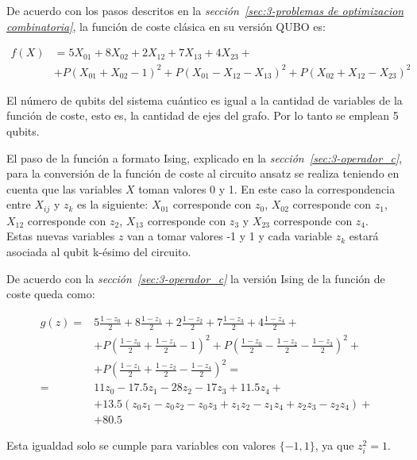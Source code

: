 De acuerdo con los pasos descritos en la \textit{sección~\ref{sec:3-problemas de optimizacion combinatoria}}, la función de coste clásica en su versión QUBO es:

\begin{align}
  f(X) &= 5X_{01} + 8X_{02} + 2X_{12} + 7X_{13} + 4X_{23} + \nonumber \\
       &+ P{(X_{01} + X_{02} - 1)}^2 + P{(X_{01} - X_{12} - X_{13})}^2 + P{(X_{02} + X_{12} - X_{23})}^2
\end{align}

El número de qubits del sistema cuántico es igual a la cantidad de variables de la función de coste, esto es, la cantidad de ejes del grafo.
Por lo tanto se emplean 5 qubits.

El paso de la función a formato Ising, explicado en la \textit{sección~\ref{sec:3-operador_c}}, para la conversión de la función de coste al circuito ansatz se realiza teniendo en cuenta que las variables $X$ toman valores 0 y 1.
En este caso la correspondencia entre $X_{ij}$ y $z_k$ es la siguiente:
$X_{01}$ corresponde con $z_0$,
$X_{02}$ corresponde con $z_1$,
$X_{12}$ corresponde con $z_2$,
$X_{13}$ corresponde con $z_3$ y
$X_{23}$ corresponde con $z_4$.
\\
Estas nuevas variables $z$ van a tomar valores -1 y 1 y cada variable $z_k$ estará asociada al qubit k-ésimo del circuito. 

De acuerdo con la \textit{sección~\ref{sec:3-operador_c}} la versión Ising de la función de coste queda como:

\begin{align}
  g(z) = &5\frac{1-z_0}{2} + 8\frac{1-z_1}{2} + 2\frac{1-z_2}{2} + 7\frac{1-z_3}{2} + 4\frac{1-z_4}{2} + \nonumber \\
         &+ P{(\frac{1-z_0}{2} + \frac{1-z_1}{2} - 1)}^2 + P{(\frac{1-z_0}{2} - \frac{1-z_2}{2} - \frac{1-z_3}{2})}^2 + \nonumber \\
         &+ P{(\frac{1-z_1}{2} + \frac{1-z_2}{2} - \frac{1-z_4}{2})}^2 = \nonumber \\
  = & 11z_0 - 17.5z_1 - 28z_2 - 17z_3 + 11.5z_4 + \nonumber \\
         &+ 13.5(z_0z_1 - z_0z_2 - z_0z_3 + z_1z_2 - z_1z_4 + z_2z_3 - z_2z_4) + \nonumber \\
         &+ 80.5
\end{align}
\par
Esta igualdad solo se cumple para variables con valores \(\{-1, 1\}\), ya que \(z_i^2 = 1\).


